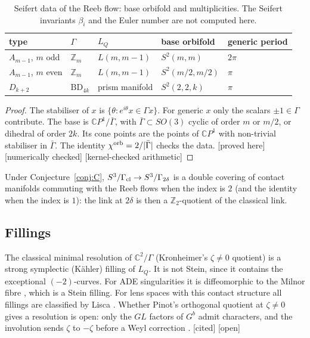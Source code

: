 \documentclass[11pt]{article}
\theoremstyle{definition}
\theoremstyle{remark}
\newcommand{\tagP}{\textsf{\small[proved here]}}
\newcommand{\tagC}{\textsf{\small[cited]}}
\newcommand{\tagN}{\textsf{\small[numerically checked]}}
\newcommand{\tagK}{\textsf{\small[kernel-checked arithmetic]}}
\newcommand{\tagO}{\textsf{\small\textcolor{red!70!black}{[open]}}}
\newcommand{\C}{\mathbb{C}}\newcommand{\R}{\mathbb{R}}\newcommand{\Z}{\mathbb{Z}}
\newcommand{\BD}{\mathrm{BD}}
\begin{document}
\begin{table}[h]\centering\small
\begin{tabular}{@{}lllll@{}}\toprule
type & $\Gamma$ & $L_Q$ & base orbifold & generic period\\\midrule
$A_{m-1}$, $m$ odd & $\Z_m$ & $L(m,m-1)$ & $S^2(m,m)$ & $2\pi$\\
$A_{m-1}$, $m$ even & $\Z_m$ & $L(m,m-1)$ & $S^2(m/2,m/2)$ & $\pi$\\
$D_{k+2}$ & $\BD_{4k}$ & prism manifold & $S^2(2,2,k)$ & $\pi$\\\bottomrule
\end{tabular}
\caption{Seifert data of the Reeb flow: base orbifold and multiplicities. The Seifert invariants $\beta_i$ and the Euler number are not computed here.}\label{tab:seifert}
\end{table}
\begin{proof}
The stabiliser of $x$ is $\{\theta: e^{i\theta}x\in\Gamma x\}$. For generic $x$ only the scalars $\pm1\in\Gamma$ contribute. The base is $\C P^1/\bar\Gamma$, with $\bar\Gamma\subset SO(3)$ cyclic of order $m$ or $m/2$, or dihedral of order $2k$. Its cone points are the points of $\C P^1$ with non-trivial stabiliser in $\bar\Gamma$. The identity $\chi^{\rm orb}=2/|\bar\Gamma|$ checks the data. \tagP{} \tagN{} \tagK
\end{proof}

Under Conjecture~\ref{conj:C}, $S^3/\Gamma_{\rm cl}\to S^3/\Gamma_{2\delta}$ is a double covering of contact manifolds commuting with the Reeb flows when the index is $2$ (and the identity when the index is $1$): the link at $2\delta$ is then a $\Z_2$-quotient of the classical link.

\subsection{Fillings}
The classical minimal resolution of $\C^2/\Gamma$ (Kronheimer's $\zeta\ne0$ quotient) is a strong symplectic (K\"ahler) filling of $L_Q$. It is not Stein, since it contains the exceptional $(-2)$-curves. For ADE singularities it is diffeomorphic to the Milnor fibre \cite{Brieskorn}, which is a Stein filling. For lens spaces with this contact structure all fillings are classified by Lisca \cite{Lis}. Whether Pinot's orthogonal quotient at $\zeta\ne0$ gives a resolution is open: only the $GL$ factors of $G^b$ admit characters, and the involution sends $\zeta$ to $-\zeta$ before a Weyl correction \cite{Nak25}. \tagC{} \tagO
\end{document}
